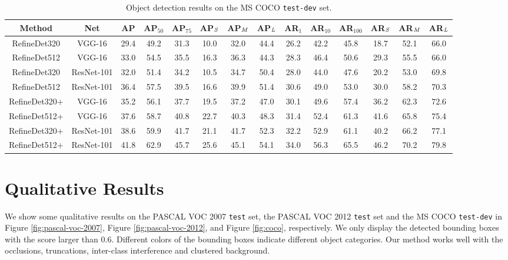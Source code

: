 \documentclass[10pt,twocolumn,letterpaper]{article}
\begin{document}
\begin{table*}
\centering
\caption{Object detection results on the MS COCO {\tt test-dev} set.}
\vspace{-2mm}
\footnotesize \setlength{\tabcolsep}{7.0pt}
\begin{threeparttable}
\begin{tabular}{c|c|ccc|ccc|ccc|ccc}
\toprule[1.5pt]
Method &Net &AP &AP$_{50}$ &AP$_{75}$ &AP$_{\it S}$ &AP$_{\it M}$ &AP$_{\it L}$ &AR$_{1}$ &AR$_{10}$ &AR$_{100}$ &AR$_{\it S}$ &AR$_{\it M}$ &AR$_{\it L}$\\
\hline
RefineDet320 &VGG-16 &29.4 &49.2 &31.3 &10.0 &32.0 &44.4 &26.2 &42.2 &45.8 &18.7 &52.1 &66.0\\
RefineDet512 &VGG-16 &33.0 &54.5 &35.5 &16.3 &36.3 &44.3 &28.3 &46.4 &50.6 &29.3 &55.5 &66.0 \\
RefineDet320 &ResNet-101 &32.0 &51.4 &34.2 &10.5 &34.7 &50.4 &28.0 &44.0 &47.6 &20.2 &53.0 &69.8 \\
RefineDet512 &ResNet-101 &36.4 &57.5 &39.5 &16.6 &39.9 &51.4 &30.6 &49.0 &53.0 &30.0 &58.2 &70.3 \\
RefineDet320+ &VGG-16 &35.2 &56.1 &37.7 &19.5 &37.2 &47.0 &30.1 &49.6 &57.4 &36.2 &62.3 &72.6 \\
RefineDet512+ &VGG-16 &37.6 &58.7 &40.8 &22.7 &40.3 &48.3 &31.4 &52.4 &61.3 &41.6 &65.8 &75.4\\
RefineDet320+ &ResNet-101 &38.6 &59.9 &41.7 &21.1 &41.7 &52.3 &32.2 &52.9 &61.1 &40.2 &66.2 &77.1 \\
RefineDet512+ &ResNet-101 &41.8 &62.9 &45.7 &25.6 &45.1 &54.1 &34.0 &56.3 &65.5 &46.2 &70.2 &79.8 \\
\bottomrule[1.5pt]
\end{tabular}
\end{threeparttable}
\label{tab:coco}
\end{table*}


\section{Qualitative Results}
We show some qualitative results on the PASCAL VOC 2007 {\tt test} set, the PASCAL VOC 2012 {\tt test} set and the MS COCO {\tt test-dev} in Figure \ref{fig:pascal-voc-2007}, Figure \ref{fig:pascal-voc-2012}, and Figure \ref{fig:coco}, respectively. We only display the detected bounding boxes with the score larger than $0.6$. Different colors of the bounding boxes indicate different object categories. Our method works well with the occlusions, truncations, inter-class interference and clustered background.
\end{document}
